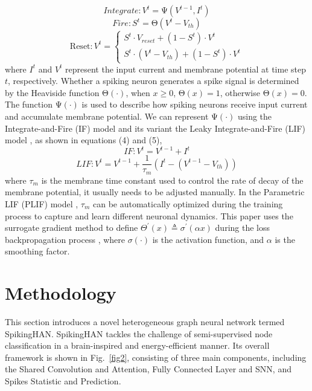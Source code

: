 \documentclass[letterpaper]{article} %
\begin{document}
\begin{equation}
Integrate:V^t=\mathrm{\Psi}\left(V^{t-1},I^t\right)\label{eq1}
\end{equation}
\begin{equation}
Fire:S^t=\mathrm{\Theta}\left(V^t-V_{th}\right)\label{eq2}
\end{equation}
\begin{equation}\mathrm{Reset:}V^t=\left\{
\begin{array}
{c}S^t\cdot V_{reset}+(1-S^t)\cdot V^t \\
S^t\cdot(V^t-V_{th})+(1-S^t)\cdot V^t
\end{array}\right.\label{eq3}
\end{equation}
where $I^t$ and $V^t$ represent the input current and membrane potential at time step $t$, respectively. Whether a spiking neuron generates a spike signal is determined by the Heaviside function $\mathrm{\Theta}(\cdot)$, when $x\geq0$, $\mathrm{\Theta}(x)=1$, otherwise $\mathrm{\Theta}(x)=0$. The function $\mathrm{\Psi}(\cdot)$ is used to describe how spiking neurons receive input current and accumulate membrane potential. We can represent $\mathrm{\Psi}(\cdot)$ using the Integrate-and-Fire (IF) model \cite{bib31} and its variant the Leaky Integrate-and-Fire (LIF) model \cite{bib32}, as shown in equations (4) and (5), 
\begin{equation}
IF:V^t=V^{t-1}+I^t\label{eq4}
\end{equation}
\begin{equation}
LIF:V^t=V^{t-1}+\frac{1}{\tau_m}\left(I^t-\left(V^{t-1}-V_{th}\right)\right)\label{eq5}
\end{equation}
where $\tau_m$ is the membrane time constant used to control the rate of decay of the membrane potential, it usually needs to be adjusted manually. In the Parametric LIF (PLIF) model \cite{bib33}, $\tau_m$ can be automatically optimized during the training process to capture and learn different neuronal dynamics. This paper uses the surrogate gradient method to define $\Theta^{\prime}(x)\triangleq\sigma^{\prime}(\alpha x)$ during the loss backpropagation process \cite{bib14}, where $\sigma(\cdot)$ is the activation function, and $\alpha$ is the smoothing factor.

\section{Methodology}
This section introduces a novel heterogeneous graph neural network termed SpikingHAN. SpikingHAN tackles the challenge of semi-supervised node classification in a brain-inspired and energy-efficient manner. Its overall framework is shown in Fig.~\ref{fig2}, consisting of three main components, including the Shared Convolution and Attention, Fully Connected Layer and SNN, and Spikes Statistic and Prediction.
\end{document}

